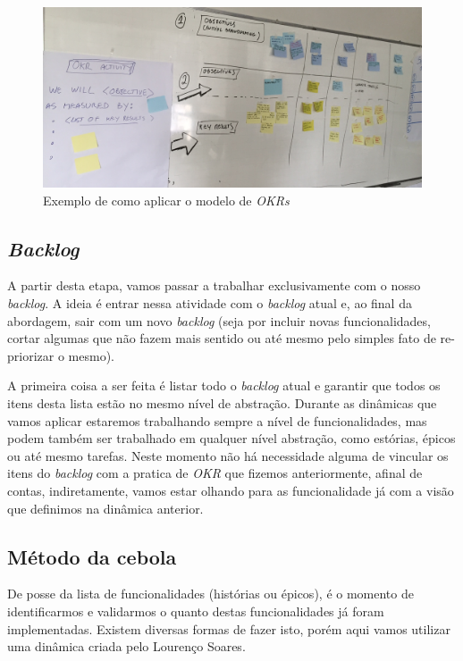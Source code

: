 \documentclass[10pt]{article}
\begin{document}
            \begin{figure}[H]
        		\centering
        		\includegraphics[width=.7\textwidth]{images/como-okr.png}
        		\caption{Exemplo de como aplicar o modelo de \textit{OKRs}}
        		\label{figura:2}
        	\end{figure}
            
        
        \subsection{\textit{Backlog}}\label{sec:abordagem-como-backlog}
            A partir desta etapa, vamos passar a trabalhar exclusivamente com o nosso \textit{backlog}. A ideia é entrar nessa atividade com o \textit{backlog} atual e, ao final da abordagem, sair com um novo \textit{backlog} (seja por incluir novas funcionalidades, cortar algumas que não fazem mais sentido ou até mesmo pelo simples fato de re-priorizar o mesmo).
            
            A primeira coisa a ser feita é listar todo o \textit{backlog} atual e garantir que todos os itens desta lista estão no mesmo nível de abstração. Durante as dinâmicas que vamos aplicar estaremos trabalhando sempre a nível de funcionalidades, mas podem também ser trabalhado em qualquer nível abstração, como estórias, épicos ou até mesmo tarefas. Neste momento não há necessidade alguma de vincular os itens do \textit{backlog} com a pratica de \textit{OKR} que fizemos anteriormente, afinal de contas, indiretamente, vamos estar olhando para as funcionalidade já com a visão que definimos na dinâmica anterior.

        \subsection{Método da cebola}\label{sec:abordagem-como-cebola}
            De posse da lista de funcionalidades (histórias ou épicos), é o momento de identificarmos e validarmos o quanto destas funcionalidades já foram implementadas. Existem diversas formas de fazer isto, porém aqui vamos utilizar uma dinâmica criada pelo Lourenço Soares.\cite{Lourenco:Cebola}
            
\end{document}
